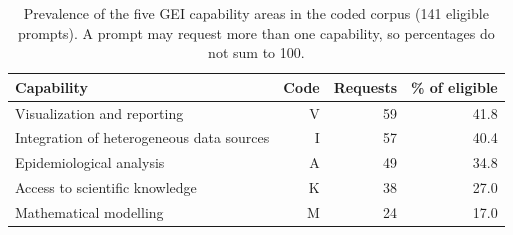 \begin{table}[htbp]
\centering
\caption{Prevalence of the five GEI capability areas in the coded corpus (141 eligible prompts). A prompt may request more than one capability, so percentages do not sum to 100.}
\label{tab:s5-capability-prevalence}
\begin{tabular}{lrrr}
\toprule
Capability & Code & Requests & \% of eligible \\
\midrule
Visualization and reporting & V & 59 & 41.8 \\
Integration of heterogeneous data sources & I & 57 & 40.4 \\
Epidemiological analysis & A & 49 & 34.8 \\
Access to scientific knowledge & K & 38 & 27.0 \\
Mathematical modelling & M & 24 & 17.0 \\
\bottomrule
\end{tabular}
\par{}
\end{table}
